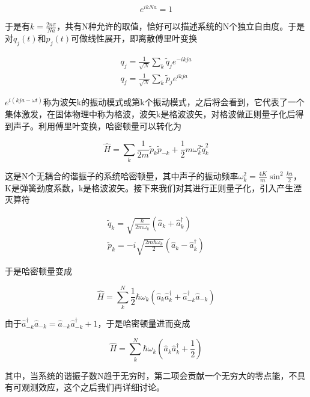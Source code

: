 \begin{equation}
    e^{ikNa}=1
\end{equation}

于是有$k=\frac{2n\pi}{Na}$，共有N种允许的取值，恰好可以描述系统的N个独立自由度。于是对$q_j(t)$和$p_j(t)$可做线性展开，即离散傅里叶变换

\begin{equation}
	\begin{array}{lr}
		q_j=\frac{1}{\sqrt{N}}\sum_{k}\tilde{q}_je^{-ikja} \\
		q_j=\frac{1}{\sqrt{N}}\sum_{k}\tilde{p}_je^{ikja}
	\end{array}
\end{equation}

$e^{i(kja-\omega t)}$称为波矢k的振动模式或第k个振动模式，之后将会看到，它代表了一个集体激发，在固体物理中称为格波，波矢k是格波波矢，对格波做正则量子化后得到声子。利用傅里叶变换，哈密顿量可以转化为

\begin{equation}
	\hat{H}=\sum_{k}\frac{1}{2m}\tilde{p}_k\tilde{p}_{-k}+\frac{1}{2}m\omega_k^2\tilde{q}_k^2
\end{equation}

这是N个无耦合的谐振子的系统哈密顿量，其中声子的振动频率$\omega_k^2=\frac{4K}{m}\sin^2\frac{ka}{2}$，K是弹簧劲度系数，k是格波波矢。接下来我们对其进行正则量子化，引入产生湮灭算符

\begin{equation}
	\begin{array}{lr}
		\tilde{q}_k=\sqrt{\frac{\hbar}{2m\omega_k}}(\hat{a}_k+\hat{a}_k^\dagger) \\
		\tilde{p}_k=-i\sqrt{\frac{2m\hbar\omega_k}{2}}(\hat{a}_k-\hat{a}_k^\dagger)
	\end{array}
\end{equation}

于是哈密顿量变成

\begin{equation}
	\hat{H}=\sum_{k}^N\frac{1}{2}\hbar\omega_k(\hat{a}_k\hat{a}_k^\dagger+\hat{a}_{-k}^\dagger\hat{a}_{-k})
\end{equation}

由于$\hat{a}_{-k}^\dagger\hat{a}_{-k}=\hat{a}_{-k}\hat{a}_{-k}^\dagger+1$，于是哈密顿量进而变成

\begin{equation}
	\hat{H}=\sum_{k}^N\hbar\omega_k(\hat{a}_k\hat{a}_k^\dagger+\frac{1}{2})
\end{equation}

其中，当系统的谐振子数N趋于无穷时，第二项会贡献一个无穷大的零点能，不具有可观测效应，这个之后我们再详细讨论。





